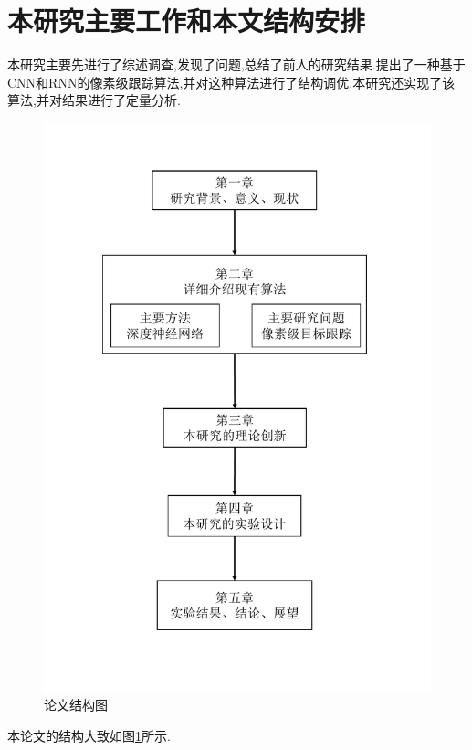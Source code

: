 \newpage
\section{本研究主要工作和本文结构安排}
本研究主要先进行了综述调查,发现了问题,总结了前人的研究结果.提出了一种基于CNN和RNN的像素级跟踪算法,并对这种算法进行了结构调优.本研究还实现了该算法,并对结果进行了定量分析.

\par
\begin{figure}[htbp!]
    \centering
    \includegraphics[width = .8\textwidth]{chap/img/thesis_structure.pdf}
    \caption{论文结构图}
    \label{fig:thesis_structure}
\end{figure}
\par
本论文的结构大致如图\ref{fig:thesis_structure}所示.